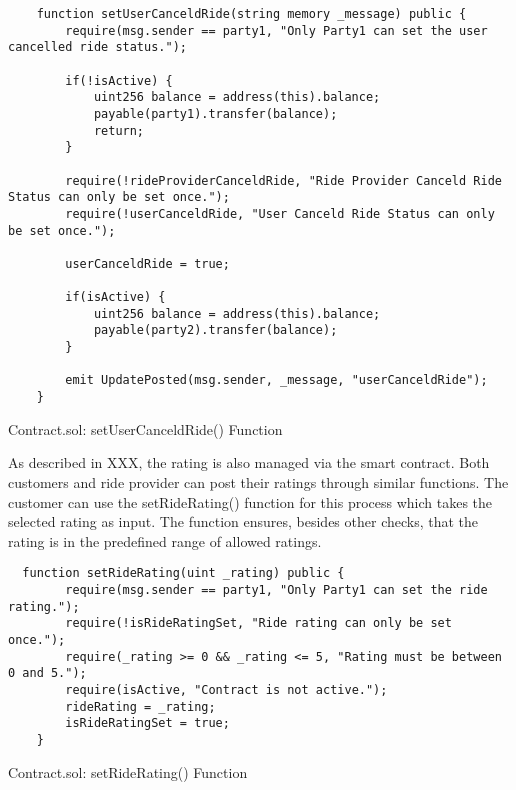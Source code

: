 \lstset{
  basicstyle=\footnotesize\ttfamily,
  breaklines=true,
  numbers=left,
  firstnumber=176
}

\begin{Listing}
\begin{lstlisting}
    function setUserCanceldRide(string memory _message) public {
        require(msg.sender == party1, "Only Party1 can set the user cancelled ride status.");
        
        if(!isActive) {
            uint256 balance = address(this).balance;
            payable(party1).transfer(balance);
            return;
        }

        require(!rideProviderCanceldRide, "Ride Provider Canceld Ride Status can only be set once.");
        require(!userCanceldRide, "User Canceld Ride Status can only be set once.");

        userCanceldRide = true;
        
        if(isActive) {
            uint256 balance = address(this).balance;
            payable(party2).transfer(balance);
        }
        
        emit UpdatePosted(msg.sender, _message, "userCanceldRide");
    }
\end{lstlisting}
  \caption{Contract.sol: setUserCanceldRide() Function}
  \label{lst:setUserCanceldRide}
\end{Listing}

As described in XXX, the rating is also managed via the smart contract. Both customers and ride provider can post their ratings through similar functions. The customer can use the setRideRating() function for this process which takes the selected rating as input.
The function ensures, besides other checks, that the rating is in the predefined range of allowed ratings. 

\lstset{
  basicstyle=\footnotesize\ttfamily,
  breaklines=true,
  numbers=left,
  firstnumber=222
}
\begin{Listing}
\begin{lstlisting}
  function setRideRating(uint _rating) public {
        require(msg.sender == party1, "Only Party1 can set the ride rating.");
        require(!isRideRatingSet, "Ride rating can only be set once.");
        require(_rating >= 0 && _rating <= 5, "Rating must be between 0 and 5.");
        require(isActive, "Contract is not active.");
        rideRating = _rating;
        isRideRatingSet = true;
    }
\end{lstlisting}
  \caption{Contract.sol: setRideRating() Function}
  \label{lst:setRideRating}
\end{Listing}

